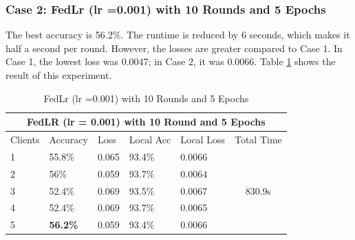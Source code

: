 \documentclass[conference]{IEEEtran}
\begin{document}
 \subsubsection{Case 2: FedLr (lr =0.001) with 10 Rounds and 5 Epochs}
 The best accuracy is 56.2\%. The runtime is reduced by 6 seconds, which makes it half a second per round. However, the losses are greater compared to Case 1. In Case 1, the lowest loss was 0.0047; in Case 2, it was 0.0066. Table \ref{lrmid} shows the result of this experiment.
 \begin{table}[ht]
 	\centering
 	\caption{FedLr (lr =0.001) with 10 Rounds and 5 Epochs}
 		\begin{tabular}{|lllllc|}
 			\hline
 			\multicolumn{6}{|c|}{FedLR (lr = 0.001) with 10 Round and 5 Epochs}                                                                                                                             \\ \hline
 			\multicolumn{1}{|l|}{Clients} & \multicolumn{1}{l|}{Accuracy} & \multicolumn{1}{l|}{Loss}  & \multicolumn{1}{l|}{Local Acc} & \multicolumn{1}{l|}{Local Loss} & \multicolumn{1}{l|}{Total Time} \\ \hline
 			\multicolumn{1}{|l|}{1}       & \multicolumn{1}{l|}{55.8\%}   & \multicolumn{1}{l|}{0.065} & \multicolumn{1}{l|}{93.4\%}    & \multicolumn{1}{l|}{0.0066}     & \multirow{5}{*}{830.9s}         \\ \cline{1-5}
 			\multicolumn{1}{|l|}{2}       & \multicolumn{1}{l|}{56\%}     & \multicolumn{1}{l|}{0.059} & \multicolumn{1}{l|}{93.7\%}    & \multicolumn{1}{l|}{0.0064}     &                                 \\ \cline{1-5}
 			\multicolumn{1}{|l|}{3}       & \multicolumn{1}{l|}{52.4\%}   & \multicolumn{1}{l|}{0.069} & \multicolumn{1}{l|}{93.5\%}    & \multicolumn{1}{l|}{0.0067}     &                                 \\ \cline{1-5}
 			\multicolumn{1}{|l|}{4}       & \multicolumn{1}{l|}{52.4\%}   & \multicolumn{1}{l|}{0.069} & \multicolumn{1}{l|}{93.7\%}    & \multicolumn{1}{l|}{0.0065}     &                                 \\ \cline{1-5}
 			\multicolumn{1}{|l|}{5}       & \multicolumn{1}{l|}{\textbf{56.2\%}}   & \multicolumn{1}{l|}{0.059} & \multicolumn{1}{l|}{93.4\%}    & \multicolumn{1}{l|}{0.0066}     &                                 \\ \hline
 		\end{tabular}%
 		\label{lrmid}
 \end{table}
 
\end{document}
